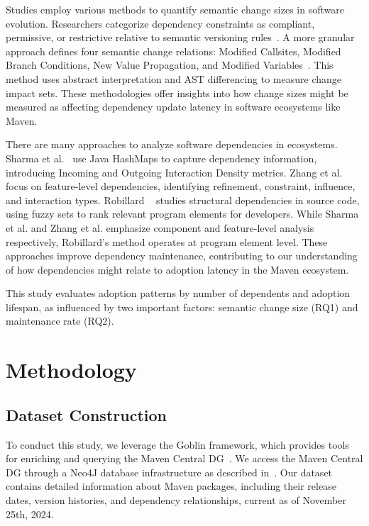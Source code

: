 \documentclass[conference]{IEEEtran}
\begin{document}
Studies employ various methods to quantify semantic change sizes in software evolution. Researchers categorize dependency constraints as compliant, permissive, or restrictive relative to semantic versioning rules~\cite{raemaekers_semantic_2017}. A more granular approach defines four semantic change relations: Modified Callsites, Modified Branch Conditions, New Value Propagation, and Modified Variables~\cite{zhang_has_2022}. This method uses abstract interpretation and AST differencing to measure change impact sets.
These methodologies offer insights into how change sizes might be measured as affecting dependency update latency in software ecosystems like Maven.

There are many approaches to analyze software dependencies in ecosystems. Sharma et al.~\cite{sharma_dependency_2009} use Java HashMaps to capture dependency information, introducing Incoming and Outgoing Interaction Density metrics. Zhang et al. \cite{zhang_feature-driven_2006} focus on feature-level dependencies, identifying refinement, constraint, influence, and interaction types. Robillard ~\cite{robillard_topology_2008} studies structural dependencies in source code, using fuzzy sets to rank relevant program elements for developers. While Sharma et al. and Zhang et al. emphasize component and feature-level analysis respectively, Robillard's method operates at program element level. These approaches improve dependency maintenance, contributing to our understanding of how dependencies might relate to adoption latency in the Maven ecosystem.


This study evaluates adoption patterns by number of dependents and adoption lifespan, as influenced by two important factors: semantic change size (RQ1) and maintenance rate (RQ2).

\section{Methodology} \label{sec: methodology}

\subsection{Dataset Construction}
To conduct this study, we leverage the Goblin framework, which provides tools for enriching and querying the Maven Central DG~\cite{jaime_goblin_2024}. We access the Maven Central DG through a Neo4J database infrastructure as described in~\cite{jaime_goblin_2024}. Our dataset contains detailed information about Maven packages, including their release dates, version histories, and dependency relationships, current as of November 25th, 2024.
\end{document}
